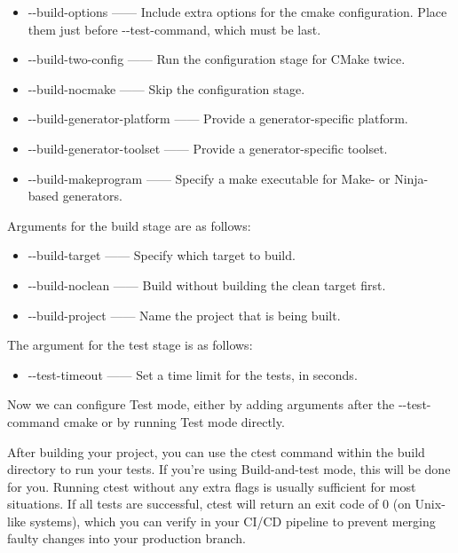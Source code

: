 \begin{itemize}
\item
-{}-build-options —— Include extra options for the cmake configuration. Place them just before -{}-test-command, which must be last.

\item
-{}-build-two-config —— Run the configuration stage for CMake twice.

\item
-{}-build-nocmake —— Skip the configuration stage.

\item
-{}-build-generator-platform —— Provide a generator-specific platform.

\item
-{}-build-generator-toolset —— Provide a generator-specific toolset.

\item
-{}-build-makeprogram —— Specify a make executable for Make- or Ninja-based generators.
\end{itemize}

Arguments for the build stage are as follows:

\begin{itemize}
\item
-{}-build-target —— Specify which target to build.

\item
-{}-build-noclean —— Build without building the clean target first.

\item
-{}-build-project —— Name the project that is being built.
\end{itemize}

The argument for the test stage is as follows:

\begin{itemize}
\item
-{}-test-timeout —— Set a time limit for the tests, in seconds.
\end{itemize}

Now we can configure Test mode, either by adding arguments after the -{}-test-command cmake or by running Test mode directly.


After building your project, you can use the ctest command within the build directory to run your tests. If you’re using Build-and-test mode, this will be done for you. Running ctest without any extra flags is usually sufficient for most situations. If all tests are successful, ctest will return an exit code of 0 (on Unix-like systems), which you can verify in your CI/CD pipeline to prevent merging faulty changes into your production branch.

